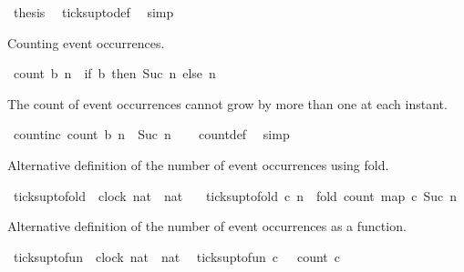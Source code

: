 \begin{isabellebody}
\ {\isacharquery}thesis\ \isamarkupfalse%
\ ticks{\isacharunderscore}up{\isacharunderscore}to{\isacharunderscore}def\ \isamarkupfalse%
\ simp\isanewline
{}\isamarkupfalse%
%
\endisatagproof
{\isafoldproof}%
%
\isadelimproof
%
\endisadelimproof
%
\begin{isamarkuptext}%
Counting event occurrences.%
\end{isamarkuptext}\isamarkuptrue%
\isamarkupfalse%
\ {\isacartoucheopen}count\ b\ n\ {\isasymequiv}\ if\ b\ then\ Suc\ n\ else\ n{\isacartoucheclose}%
\begin{isamarkuptext}%
The count of event occurrences cannot grow by more than one at each instant.%
\end{isamarkuptext}\isamarkuptrue%
\isamarkupfalse%
\ count{\isacharunderscore}inc{\isacharcolon}\ {\isacartoucheopen}count\ b\ n\ {\isasymle}\ Suc\ n{\isacartoucheclose}\isanewline
%
\isadelimproof
\ \ %
\endisadelimproof
%
\isatagproof
{}\isamarkupfalse%
\ count{\isacharunderscore}def\ \isamarkupfalse%
\ simp%
\endisatagproof
{\isafoldproof}%
%
\isadelimproof
%
\endisadelimproof
%
\begin{isamarkuptext}%
Alternative definition of the number of event occurrences using fold.%
\end{isamarkuptext}\isamarkuptrue%
\isamarkupfalse%
\ ticks{\isacharunderscore}up{\isacharunderscore}to{\isacharunderscore}fold\ {\isacharcolon}{\isacharcolon}\ {\isacartoucheopen}{\isacharbrackleft}clock{\isacharcomma}\ nat{\isacharbrackright}\ {\isasymRightarrow}\ nat{\isacartoucheclose}\isanewline
\ \ \ {\isacartoucheopen}ticks{\isacharunderscore}up{\isacharunderscore}to{\isacharunderscore}fold\ c\ n\ {\isacharequal}\ fold\ count\ {\isacharparenleft}map\ c\ {\isacharbrackleft}{}{\isachardot}{\isachardot}{\isacharless}Suc\ n{\isacharbrackright}{\isacharparenright}\ {}{\isacartoucheclose}%
\begin{isamarkuptext}%
Alternative definition of the number of event occurrences as a function.%
\end{isamarkuptext}\isamarkuptrue%
\isamarkupfalse%
\ ticks{\isacharunderscore}up{\isacharunderscore}to{\isacharunderscore}fun\ {\isacharcolon}{\isacharcolon}\ {\isacartoucheopen}{\isacharbrackleft}clock{\isacharcomma}\ nat{\isacharbrackright}\ {\isasymRightarrow}\ nat{\isacartoucheclose}\isanewline
{}\isanewline
\ \ {\isacartoucheopen}ticks{\isacharunderscore}up{\isacharunderscore}to{\isacharunderscore}fun\ c\ {}\ {\isacharequal}\ count\ {\isacharparenleft}c\ {}{\isacharparenright}\ {}{\isacartoucheclose}\isanewline

\end{isabellebody}
